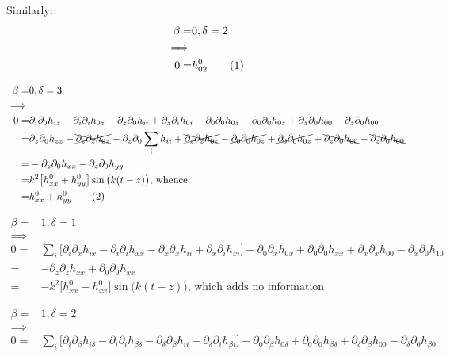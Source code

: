 \documentclass[]{article}
\newcommand\numberthis{\addtocounter{equation}{1}\tag{\theequation}}
\begin{document}
{\begin{appendices}
	Similarly:
	\begin{align*}
		\beta=&0,\delta=2\\
		\implies&\\
		0=&h^0_{02} \numberthis \label{eq:h:02}
	\end{align*}	
	
	\begin{align*}
		\beta=&0,\delta=3\\
		\implies&\\
		0=&	\partial_i\partial_0 h_{iz} - \partial_i\partial_i h_{0z} -  \partial_z\partial_0 h_{ii} + \partial_z\partial_i h_{0 i}-\partial_0\partial_0 h_{0z} + \partial_0\partial_0 h_{0z} +  \partial_z\partial_0 h_{00} - \partial_z\partial_0 h_{0 0}\\
		=&	\partial_z\partial_0 h_{zz} - \xcancel{\partial_z\partial_z h_{0z}} -  \partial_z\partial_0 \sum_i h_{ii} + \xcancel{\partial_z\partial_z h_{0 z}}-\cancel{\partial_0\partial_0 h_{0z}} + \cancel{\partial_0\partial_0 h_{0z}} +  \bcancel{\partial_z\partial_0 h_{00}} - \bcancel{\partial_z\partial_0 h_{0 0}}\\
		=& -\partial_z\partial_0 h_{xx} -\partial_z\partial_0 h_{yy}\\
		=& k^2 \big[ h^0_{xx}+ h^0_{yy}\big] \sin\big(k(t-z)\big) \text{, whence:}\\
		=& h^0_{xx}+ h^0_{yy} \numberthis \label{eq:h:03}
	\end{align*}	
	
	\begin{align*}
		\beta=&1,\delta=1\\
		\implies&\\
		0 =& \sum_i\big[\partial_i\partial_x h_{ix} - \partial_i\partial_i h_{xx} -  \partial_x\partial_x h_{ii} + \partial_x\partial_i h_{x i}\big]-\partial_0\partial_x h_{0x} + \partial_0\partial_0 h_{xx} +  \partial_x\partial_x h_{00} - \partial_x\partial_0 h_{1 0}\\
		=&  - \partial_z\partial_z h_{xx} + \partial_0\partial_0 h_{xx}  \\
		=& - k^2 \big[ h^0_{xx}- h^0_{xx}\big] \sin\big(k(t-z)\big) \text{, which adds no information}
	\end{align*}
	
	\begin{align*}
		\beta=&1,\delta=2\\
		\implies&\\
		0 =&	\sum_i\big[\partial_i\partial_\beta h_{i\delta} - \partial_i\partial_i h_{\beta\delta} -  \partial_\delta\partial_\beta h_{ii} + \partial_\delta\partial_i h_{\beta i}\big]-\partial_0\partial_\beta h_{0\delta} + \partial_0\partial_0 h_{\beta\delta} +  \partial_\delta\partial_\beta h_{00} - \partial_\delta\partial_0 h_{\beta 0}
	\end{align*}
	

\end{appendices}}
\end{document}
